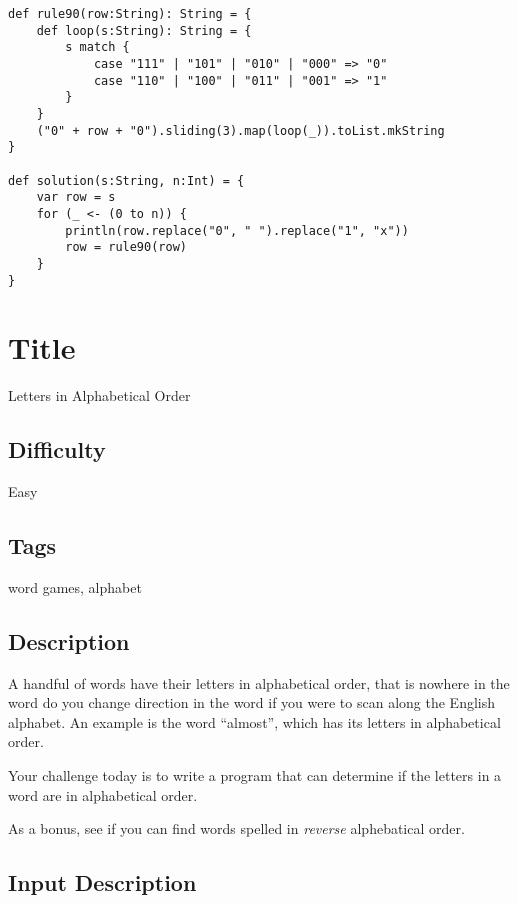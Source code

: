 \begin{verbatim}
def rule90(row:String): String = {
    def loop(s:String): String = {
        s match {
            case "111" | "101" | "010" | "000" => "0"
            case "110" | "100" | "011" | "001" => "1"
        }
    }
    ("0" + row + "0").sliding(3).map(loop(_)).toList.mkString
}

def solution(s:String, n:Int) = {
    var row = s
    for (_ <- (0 to n)) {
        println(row.replace("0", " ").replace("1", "x"))
        row = rule90(row)
    }
}
\end{verbatim}

\section{Title}\label{title-4}

Letters in Alphabetical Order

\subsection{Difficulty}\label{difficulty-4}

Easy

\subsection{Tags}\label{tags-4}

word games, alphabet

\subsection{Description}\label{description-4}

A handful of words have their letters in alphabetical order, that is
nowhere in the word do you change direction in the word if you were to
scan along the English alphabet. An example is the word ``almost'',
which has its letters in alphabetical order.

Your challenge today is to write a program that can determine if the
letters in a word are in alphabetical order.

As a bonus, see if you can find words spelled in \emph{reverse}
alphebatical order.

\subsection{Input Description}\label{input-description-3}

